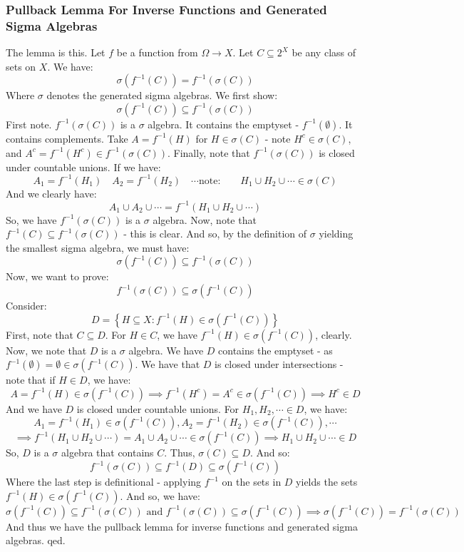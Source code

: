 \documentclass[12pt,a4paper]{article}
\newcommand{\1}[1]{\mathbbm{1}\left\{ #1 \right\}}
\begin{document}
\subsubsection{Pullback Lemma For Inverse Functions and Generated Sigma Algebras} The lemma is this. Let $f$ be a function from $\Omega \to X$. Let $C \subseteq 2^X$ be any class of sets on $X$. We have:
$$
	\sigma(f^{-1}(C)) = f^{-1}(\sigma(C))
$$
Where $\sigma$ denotes the generated sigma algebras. We first show:
$$
	\sigma(f^{-1}(C)) \subseteq f^{-1}(\sigma(C))
$$
First note. $f^{-1}(\sigma(C))$ is a $\sigma$ algebra. It contains the emptyset - $f^{-1}(\emptyset)$. It contains complements. Take $A = f^{-1}(H)$ for $H \in \sigma(C)$ - note $H^c \in \sigma(C)$, and $A^c = f^{-1}(H^c) \in f^{-1}(\sigma(C))$. Finally, note that $f^{-1}(\sigma(C))$ is closed under countable unions. If we have:
$$
	A_1 = f^{-1}(H_1) \quad
	A_2 = f^{-1}(H_2) \quad\cdots
	\text{note:} \quad\quad H_1 \cup H_2 \cup \cdots \in \sigma(C)
$$
And we clearly have:
$$
	A_1 \cup A_2 \cup \cdots = f^{-1}(H_1 \cup H_2 \cup \cdots)
$$
So, we have $f^{-1}(\sigma(C))$ is a $\sigma$ algebra. Now, note that $f^{-1}(C) \subseteq f^{-1}(\sigma(C))$ - this is clear. And so, by the definition of $\sigma$ yielding the smallest sigma algebra, we must have:
$$
	\sigma(f^{-1}(C)) \subseteq f^{-1}(\sigma(C))
$$
Now, we want to prove:
$$
	f^{-1}(\sigma(C)) \subseteq \sigma(f^{-1}(C))
$$
Consider:
$$
	D = \left\{H \subseteq X : f^{-1}(H) \in \sigma(f^{-1}(C))\right\}
$$
First, note that $C \subseteq D$. For $H \in C$, we have $f^{-1}(H) \in \sigma(f^{-1}(C))$, clearly. Now, we note that $D$ is a $\sigma$ algebra. We have $D$ contains the emptyset - as $f^{-1}(\emptyset) = \emptyset \in \sigma(f^{-1}(C))$. We have that $D$ is closed under intersections - note that if $H \in D$, we have:
$$
	A = f^{-1}(H) \in \sigma(f^{-1}(C)) \implies
	f^{-1}(H^c) = A^c \in \sigma(f^{-1}(C)) \implies H^c \in D
$$
And we have $D$ is closed under countable unions. For $H_1, H_2, \cdots \in D$, we have:
$$
	A_1 = f^{-1}(H_1) \in \sigma(f^{-1}(C)), A_2 = f^{-1}(H_2) \in \sigma(f^{-1}(C)), \cdots
$$
$$
	\implies
	f^{-1}(H_1 \cup H_2 \cup \cdots) =
	A_1 \cup A_2 \cup \cdots \in \sigma(f^{-1}(C))
	\implies
	H_1 \cup H_2 \cup \cdots \in D
$$
So, $D$ is a $\sigma$ algebra that contains $C$. Thus, $\sigma(C) \subseteq D$. And so:
$$
	f^{-1}(\sigma(C)) \subseteq f^{-1}(D) \subseteq \sigma(f^{-1}(C))
$$
Where the last step is definitional - applying $f^{-1}$ on the sets in $D$ yields the sets $f^{-1}(H) \in \sigma(f^{-1}(C))$. And so, we have:
$$
	\sigma(f^{-1}(C)) \subseteq f^{-1}(\sigma(C)) \text{ and }
	f^{-1}(\sigma(C)) \subseteq \sigma(f^{-1}(C)) \implies
	\sigma(f^{-1}(C)) = f^{-1}(\sigma(C))
$$
And thus we have the pullback lemma for inverse functions and generated sigma algebras. qed.
\end{document}
